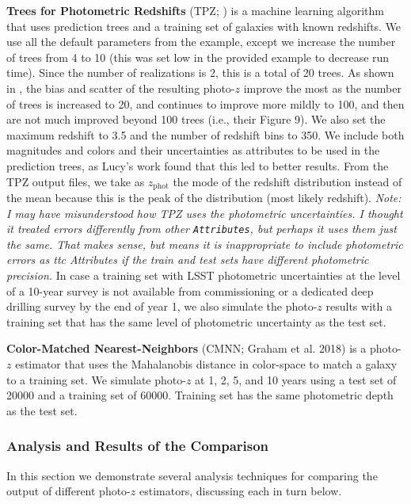 \documentclass[DM,lsstdraft,toc]{lsstdoc}
\begin{document}
\textbf{Trees for Photometric Redshifts} (TPZ; \citealt{2013ascl.soft04011C,2013MNRAS.432.1483C}) is a machine learning algorithm that uses prediction trees and a training set of galaxies with known redshifts. We use all the default parameters from the example, except we increase the number of trees from 4 to 10 (this was set low in the provided example to decrease run time). Since the number of realizations is 2, this is a total of 20 trees. As shown in \cite{2013MNRAS.432.1483C}, the bias and scatter of the resulting photo-$z$ improve the most as the number of trees is increased to 20, and continues to improve more mildly to 100, and then are not much improved beyond 100 trees (i.e., their Figure 9). We also set the maximum redshift to 3.5 and the number of redshift bins to 350. We include both magnitudes and colors and their uncertainties as attributes to be used in the prediction trees, as Lucy's work found that this led to better results. From the TPZ output files, we take as $z_\mathrm{phot}$ the mode of the redshift distribution instead of the mean because this is the peak of the distribution (most likely redshift). \textit{Note: I may have misunderstood how TPZ uses the photometric uncertainties. I thought it treated errors differently from other \texttt{Attributes}, but perhaps it uses them just the same. That makes sense, but means it is inappropriate to include photometric errors as {ttc Attributes} if the train and test sets have different photometric precision.} In case a training set with LSST photometric uncertainties at the level of a 10-year survey is not available from commissioning or a dedicated deep drilling survey by the end of year 1, we also simulate the photo-$z$ results with a training set that has the same level of photometric uncertainty as the test set.

\textbf{Color-Matched Nearest-Neighbors} (CMNN; Graham et al. 2018) is a photo-$z$ estimator that uses the Mahalanobis distance in color-space to match a galaxy to a training set. We simulate photo-$z$ at 1, 2, 5, and 10 years using a test set of 20000 and a training set of 60000. Training set has the same photometric depth as the test set.


\subsubsection{Analysis and Results of the Comparison}\label{sssec:sel_ex_comp}

In this section we demonstrate several analysis techniques for comparing the output of different photo-$z$ estimators, discussing each in turn below.
\end{document}
